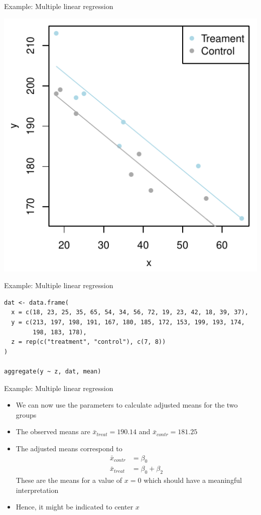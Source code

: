 \documentclass[aspectratio=169]{beamer}
\begin{document}
\begin{frame}[fragile]{Example: Multiple linear regression}
\begin{center}
\includegraphics[scale=.8]{../figures/ancova2}
\end{center}
\end{frame}

\begin{frame}[fragile]{Example: Multiple linear regression}
\begin{lstlisting}
dat <- data.frame(
  x = c(18, 23, 25, 35, 65, 54, 34, 56, 72, 19, 23, 42, 18, 39, 37),
  y = c(213, 197, 198, 191, 167, 180, 185, 172, 153, 199, 193, 174,
        198, 183, 178),
  z = rep(c("treatment", "control"), c(7, 8))
)

aggregate(y ~ z, dat, mean)
\end{lstlisting}
\end{frame}

\begin{frame}[fragile]{Example: Multiple linear regression}
  \begin{itemize}
    \item We can now use the parameters to calculate adjusted means for the
      two groups
    \item The observed means are $\bar x_{treat} = 190.14$ and $\bar
      x_{contr} = 181.25$
    \item The adjusted means correspond to
\begin{align*}
\bar x_{contr} & = \beta_0\\
\bar x_{treat} & = \beta_0 + \beta_2
\end{align*}
These are the means for a value of $x = 0$ which should have a meaningful
interpretation
\item Hence, it might be indicated to center $x$
  \end{itemize}
\end{frame}
\end{document}
